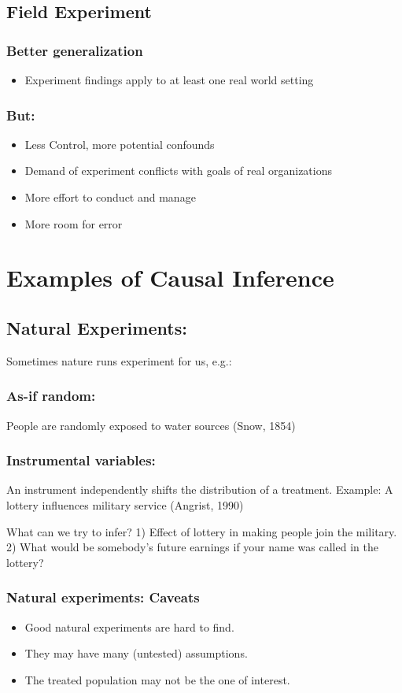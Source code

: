 \documentclass[a4paper]{article}
\begin{document}
\subsection{Field Experiment}
\subsubsection{Better generalization}
\begin{itemize}
\item Experiment findings apply to at least one real world setting
\end{itemize}

\subsubsection{But:}
\begin{itemize}
\item Less Control, more potential confounds
\item Demand of experiment conflicts with goals of real organizations
\item More effort to conduct and manage
\item More room for error
\end{itemize}

\section{Examples of Causal Inference}
\subsection{Natural Experiments:}
Sometimes nature runs experiment for us, e.g.:

\subsubsection{As-if random:} People are randomly exposed to water sources (Snow, 1854)
\subsubsection{Instrumental variables:} An instrument independently shifts the distribution of a treatment.
Example: A lottery influences military service (Angrist, 1990)

What can we try to infer?
1) Effect of lottery in making people join the military.
2) What would be somebody's future earnings if your name was called in the lottery?

\subsubsection*{Natural experiments: Caveats}
\begin{itemize}
\item Good natural experiments are hard to find.
\item They may have many (untested) assumptions.
\item The treated population may not be the one of interest.
\end{itemize}
\end{document}
